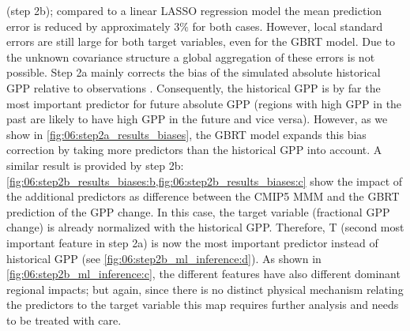 (step 2b); compared to a linear \ac{LASSO} regression model the mean prediction
error is reduced by approximately $3 \unit{\%}$ for both cases. However, local
standard errors are still large for both target variables, even for the
\ac{GBRT} model. Due to the unknown covariance structure a global aggregation
of these errors is not possible. Step 2a mainly corrects the bias of the
simulated absolute historical \ac{GPP} relative to observations
\autocite{Anav2013}. Consequently, the historical \ac{GPP} is by far the most
important predictor for future absolute \ac{GPP} (regions with high \ac{GPP} in
the past are likely to have high \ac{GPP} in the future and vice versa).
However, as we show in \cref{fig:06:step2a_results_biases}, the \ac{GBRT} model
expands this bias correction by taking more predictors than the historical
\ac{GPP} into account. A similar result is provided by step 2b:
\cref{fig:06:step2b_results_biases:b,fig:06:step2b_results_biases:c} show the
impact of the additional predictors as difference between the \acs{CMIP}5
\ac{MMM} and the \ac{GBRT} prediction of the \ac{GPP} change. In this case, the
target variable (fractional \ac{GPP} change) is already normalized with the
historical \ac{GPP}. Therefore, \ac{T} (second most important feature in step
2a) is now the most important predictor instead of historical \ac{GPP} (see
\cref{fig:06:step2b_ml_inference:d}). As shown in
\cref{fig:06:step2b_ml_inference:c}, the different features have also different
dominant regional impacts; but again, since there is no distinct physical
mechanism relating the predictors to the target variable this map requires
further analysis and needs to be treated with care.


